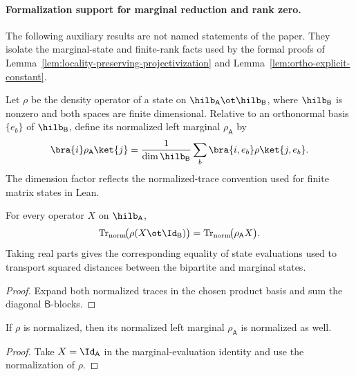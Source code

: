 \paragraph{Formalization support for marginal reduction and rank zero.}
The following auxiliary results are not named statements of the paper. They
isolate the marginal-state and finite-rank facts used by the formal proofs of
Lemma~\ref{lem:locality-preserving-projectivization} and
Lemma~\ref{lem:ortho-explicit-constant}.

\begin{definition}
	\label{def:left-marginal-state}
	\leanok
	Let $\rho$ be the density operator of a state on
	$\hilb_{\mathsf A}\ot\hilb_{\mathsf B}$, where $\hilb_{\mathsf B}$ is nonzero
	and both spaces are finite dimensional. Relative to an orthonormal basis $\{e_b\}$ of
	$\hilb_{\mathsf B}$, define its normalized left marginal $\rho_{\mathsf A}$ by
	\[
		\bra{i}\rho_{\mathsf A}\ket{j}
		= \frac{1}{\dim \hilb_{\mathsf B}}\sum_b
		\bra{i,e_b}\rho\ket{j,e_b}.
	\]
	The dimension factor reflects the normalized-trace convention used for
	finite matrix states in Lean.
\end{definition}

\begin{lemma}
	\label{lem:left-marginal-state-evaluation}
	\leanok
	For every operator $X$ on $\hilb_{\mathsf A}$,
	\[
		\operatorname{Tr}_{\mathrm{norm}}\!\bigl(\rho(X\ot\Id_{\mathsf B})\bigr)
		= \operatorname{Tr}_{\mathrm{norm}}\!\bigl(\rho_{\mathsf A}X\bigr).
	\]
	Taking real parts gives the corresponding equality of state evaluations used
	to transport squared distances between the bipartite and marginal states.
\end{lemma}
\begin{proof}
	\leanok
	Expand both normalized traces in the chosen product basis and sum the
	diagonal $\mathsf B$-blocks.
\end{proof}

\begin{lemma}
	\label{lem:left-marginal-state-normalization}
	\leanok
	If $\rho$ is normalized, then its normalized left marginal
	$\rho_{\mathsf A}$ is normalized as well.
\end{lemma}
\begin{proof}
	\leanok
	Take $X=\Id_{\mathsf A}$ in the marginal-evaluation identity and use the
	normalization of $\rho$.
\end{proof}

